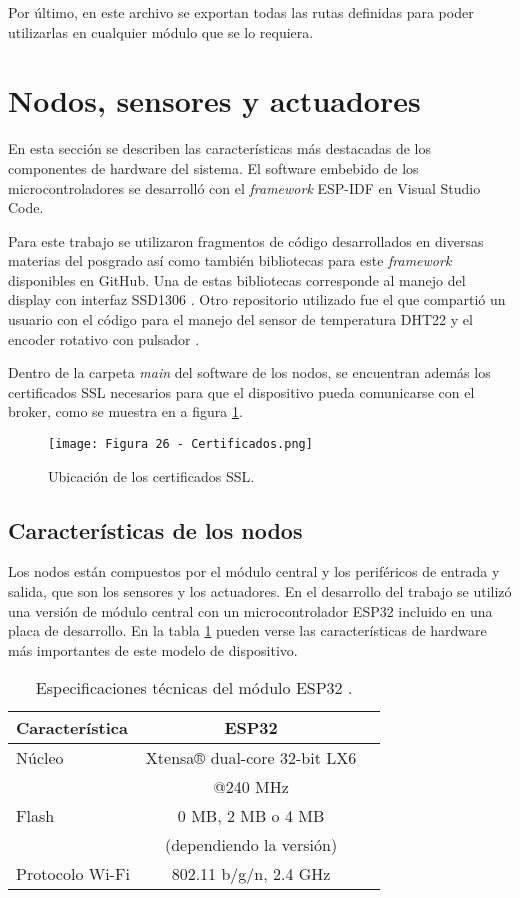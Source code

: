 Por último, en este archivo se exportan todas las rutas definidas para poder utilizarlas en cualquier módulo que se lo requiera.

\section{Nodos, sensores y actuadores}

En esta sección se describen las características más destacadas de los componentes de hardware del sistema. El software embebido de los microcontroladores se desarrolló con el \textit{framework} ESP-IDF \citep{29} en Visual Studio Code.

Para este trabajo se utilizaron fragmentos de código desarrollados en diversas materias del posgrado así como también bibliotecas para este \textit{framework} disponibles en GitHub. Una de estas bibliotecas corresponde al manejo del display con interfaz SSD1306 \citep{30}. Otro repositorio utilizado fue el que compartió un usuario con el código para el manejo del sensor de temperatura DHT22 y el encoder rotativo con pulsador \citep{31}.

Dentro de la carpeta \textit{main} del software de los nodos, se encuentran además los certificados SSL necesarios para que el dispositivo pueda comunicarse con el broker, como se muestra en a figura \ref{fig:26}.

\begin{figure}[h]
\centering
\texttt{[image: Figura 26 - Certificados.png]}
\caption[Certificados]{Ubicación de los certificados SSL.}
\label{fig:26}
\end{figure}

\subsection{Características de los nodos}

Los nodos están compuestos por el módulo central y los periféricos de entrada y salida, que son los sensores y los actuadores. En el desarrollo del trabajo se utilizó una versión de módulo central con un microcontrolador ESP32 incluido en una placa de desarrollo. En la tabla \ref{tab:esp32} pueden verse las características de hardware más importantes de este modelo de dispositivo.
\newpage

\begin{table}[h]
\centering
\caption[Módulos ESP32]{Especificaciones técnicas del módulo ESP32 \citep{32}.}
\begin{tabular}{l c c}
\toprule
\textbf{Característica} & \textbf{ESP32}\\
\midrule
Núcleo			& Xtensa® dual-core 32-bit LX6\\
				& @240 MHz\\
Flash			& 0 MB, 2 MB o 4 MB\\
				& (dependiendo la versión)\\
Protocolo Wi-Fi	& 802.11 b/g/n, 2.4 GHz\\
\bottomrule
\hline
\end{tabular}
\label{tab:esp32}
\end{table}

